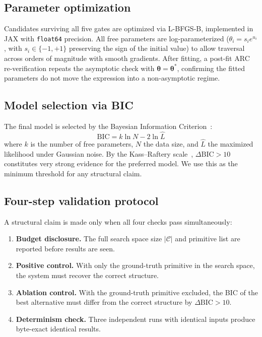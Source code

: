 ﻿\documentclass{article}
\begin{document}
\subsection{Parameter optimization}

Candidates surviving all five gates are optimized via L-BFGS-B, implemented
in JAX with \texttt{float64} precision.
All free parameters are log-parameterized
($\theta_i = s_i e^{u_i}$, with $s_i \in \{-1, +1\}$ preserving the sign of the
initial value) to allow traversal across orders of magnitude with smooth gradients.
After fitting, a post-fit ARC re-verification repeats the asymptotic check
with $\boldsymbol{\theta} = \boldsymbol{\theta}^*$, confirming the fitted
parameters do not move the expression into a non-asymptotic regime.

\subsection{Model selection via BIC}

The final model is selected by the Bayesian Information Criterion~\cite{schwarz1978}:
\begin{equation}
  \mathrm{BIC} = k \ln N - 2 \ln \hat{L}
\end{equation}
where $k$ is the number of free parameters, $N$ the data size, and $\hat{L}$
the maximized likelihood under Gaussian noise.
By the Kass--Raftery scale~\cite{kass1995}, $\Delta\mathrm{BIC} > 10$
constitutes very strong evidence for the preferred model.
We use this as the minimum threshold for any structural claim.

\subsection{Four-step validation protocol}

A structural claim is made only when all four checks pass simultaneously:
\begin{enumerate}[noitemsep,leftmargin=*]
  \item \textbf{Budget disclosure.} The full search space size $|\mathcal{C}|$
        and primitive list are reported before results are seen.
  \item \textbf{Positive control.} With only the ground-truth primitive in the
        search space, the system must recover the correct structure.
  \item \textbf{Ablation control.} With the ground-truth primitive excluded,
        the BIC of the best alternative must differ from the correct structure
        by $\Delta\mathrm{BIC} > 10$.
  \item \textbf{Determinism check.} Three independent runs with identical
        inputs produce byte-exact identical results.
\end{enumerate}
\end{document}
